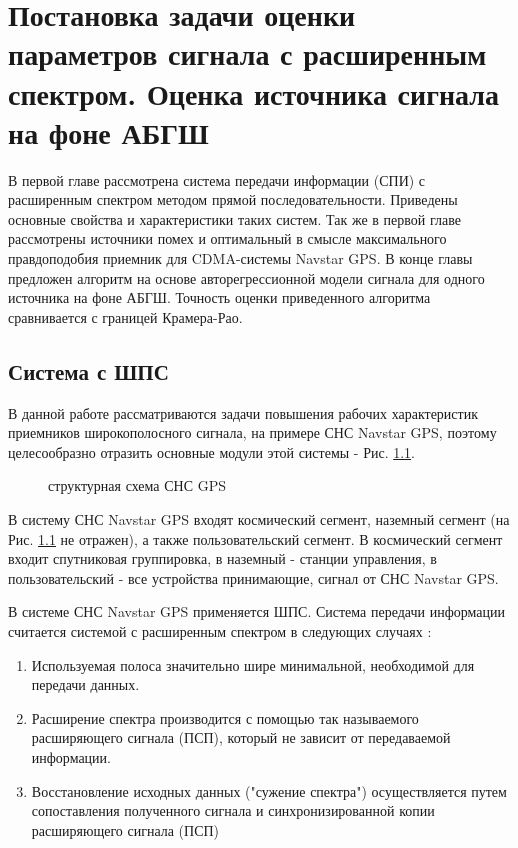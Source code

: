\chapter{Постановка задачи оценки параметров сигнала с расширенным спектром. Оценка источника сигнала на фоне АБГШ}

В первой главе рассмотрена система передачи информации (СПИ) с расширенным спектром методом прямой последовательности. Приведены основные свойства и характеристики
таких систем. Так же в первой главе рассмотрены источники помех и оптимальный в смысле максимального правдоподобия приемник для CDMA-системы Navstar GPS. В конце главы
предложен алгоритм на основе авторегрессионной модели сигнала для одного источника на фоне АБГШ. Точность оценки приведенного алгоритма сравнивается с границей Крамера-Рао. 

\section{Система с ШПС}
В данной работе рассматриваются задачи повышения рабочих характеристик приемников широкополосного сигнала, на примере СНС Navstar GPS,
поэтому целесообразно отразить основные модули этой системы - Рис. \ref{pic:sec1_gnss_system}.
\begin{figure}[h]
	\center{}
	\caption{структурная схема СНС GPS}
	\label{pic:sec1_gnss_system}
\end{figure}

В систему СНС Navstar GPS входят космический сегмент, наземный сегмент (на Рис. \ref{pic:sec1_gnss_system} не
отражен), а также пользовательский сегмент. В космический сегмент входит спутниковая группировка, в 
наземный - станции управления, в пользовательский - все устройства принимающие, сигнал от СНС Navstar GPS.

В системе СНС Navstar GPS применяется ШПС. Система передачи информации считается системой с расширенным спектром в следующих случаях \cite{sklyar}:
\begin{enumerate}
	\item Используемая полоса значительно шире минимальной, необходимой для передачи данных.
	\item Расширение спектра производится с помощью так называемого расширяющего сигнала (ПСП),
		который не зависит от передаваемой информации.
	\item Восстановление исходных данных ("сужение спектра") осуществляется путем сопоставления полученного
		сигнала и синхронизированной копии расширяющего сигнала (ПСП)
\end{enumerate}

